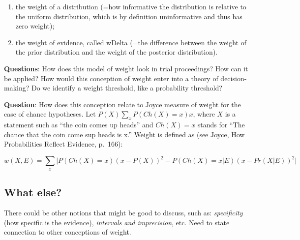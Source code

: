 \documentclass[
  10pt,
  dvipsnames,enabledeprecatedfontcommands]{scrartcl}
\begin{document}
\begin{enumerate}
\def\labelenumi{(\alph{enumi})}
\item
  the weight of a distribution (=how informative the distribution is
  relative to the uniform distribution, which is by definition
  uninformative and thus has zero weight);
\item
  the weight of evidence, called wDelta (=the difference between the
  weight of the prior distribution and the weight of the posterior
  distribution).
\end{enumerate}

\textbf{Questions}: How does this model of weight look in trial
proceedings? How can it be applied? How would this conception of weight
enter into a theory of decision-making? Do we identify a weight
threshold, like a probability threshold?


\textbf{Question}: How does this conception relate to Joyce measure of
weight for the case of chance hypotheses. Let
\(P(X)\sum_x P(Ch(X)=x)x\), where \(X\) is a statement such as ``the
coin comes up heads'' and \(Ch(X)=x\) stands for ``The chance that the
coin come sup heads is x.'' Weight is defined as (see Joyce, How
Probabilities Reflect Evidence, p.~166):

\[w(X, E) = \sum_x \vert P(Ch(X)=x)(x-P(X))^2 - P(Ch(X)=x \vert E)(x-Pr(X \vert E))^2\vert\]


\hypertarget{what-else}{%
\subsection{What else?}\label{what-else}}

There could be other notions that might be good to discuss, such as:
\emph{specificity} (how specific is the evidence), \emph{intervals and
imprecision}, etc. Need to state connection to other conceptions of
weight.

\end{document}
